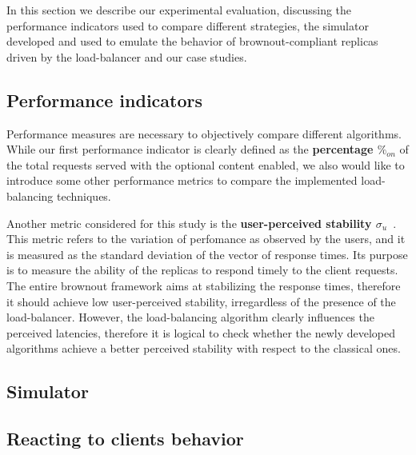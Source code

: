 In this section we describe our experimental evaluation, discussing
the performance indicators used to compare different strategies, the
simulator developed and used to emulate the behavior of
brownout-compliant replicas driven by the load-balancer and our case
studies.

\subsection{Performance indicators}

Performance measures are necessary to objectively compare different
algorithms. While our first performance indicator is clearly defined
as the \textbf{percentage $\%_{on}$} of the total requests served with
the optional content enabled, we also would like to introduce some
other performance metrics to compare the implemented load-balancing
techniques.

Another metric considered for this study is the \textbf{user-perceived
  stability $\sigma_u$}~\cite{GeograficalSASO}. This metric refers to
the variation of perfomance as observed by the users, and it is
measured as the standard deviation of the vector of response
times. Its purpose is to measure the ability of the replicas to
respond timely to the client requests. The entire brownout framework
aims at stabilizing the response times, therefore it should achieve
low user-perceived stability, irregardless of the presence of the
load-balancer. However, the load-balancing algorithm clearly
influences the perceived latencies, therefore it is logical to check
whether the newly developed algorithms achieve a better perceived
stability with respect to the classical ones.


\subsection{Simulator}




\subsection{Reacting to clients behavior}


